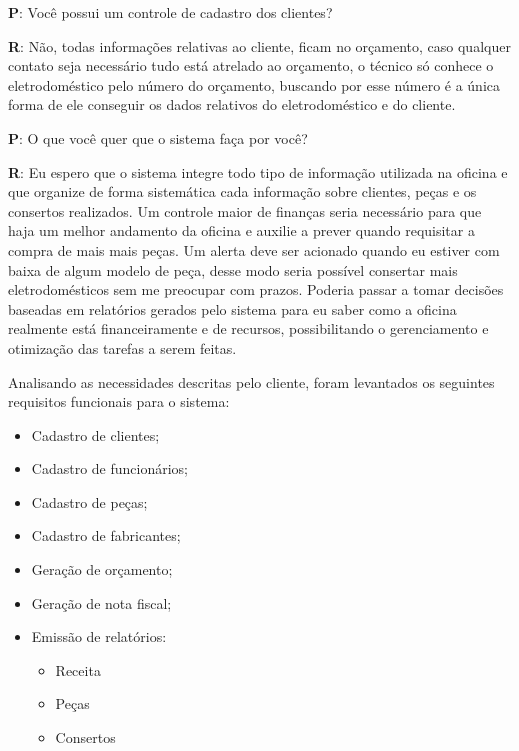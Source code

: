 \documentclass[a4paper,10pt]{article}
\begin{document}
\begin{framed}

\textbf{P}: Você possui um controle de cadastro dos clientes?

\textbf{R}: Não, todas informações relativas ao cliente, ficam no orçamento, caso qualquer contato seja necessário tudo está atrelado ao orçamento, o técnico só conhece o eletrodoméstico pelo número do orçamento, buscando por esse número é a única forma de ele conseguir os dados relativos do eletrodoméstico e do cliente.
\end{framed}

\begin{framed}

\textbf{P}: O que você quer que o sistema faça por você?

\textbf{R}: Eu espero que o sistema integre todo tipo de informação utilizada na oficina e que organize de forma sistemática cada informação sobre clientes, peças e os consertos realizados. Um controle maior de finanças seria necessário para que haja um melhor andamento da oficina e auxilie a prever quando requisitar a compra de mais mais peças. Um alerta deve ser acionado quando eu estiver com baixa de algum modelo de peça, desse modo seria possível consertar mais eletrodomésticos sem me preocupar com prazos. Poderia passar a tomar decisões baseadas em relatórios gerados pelo sistema para eu saber como a oficina realmente está financeiramente e de recursos, possibilitando o gerenciamento e otimização das tarefas a serem feitas.
\end{framed}

Analisando as necessidades descritas pelo cliente, foram levantados os seguintes requisitos funcionais para o sistema:

\begin{itemize}
\item Cadastro de clientes;
\item Cadastro de funcionários;
\item Cadastro de peças;
\item Cadastro de fabricantes;
\item Geração de orçamento;
\item Geração de nota fiscal;
\item Emissão de relatórios:
  \begin{itemize}
	\item Receita
	\item Peças
	\item Consertos
  \end{itemize}
  
\end{itemize}
\end{document}
